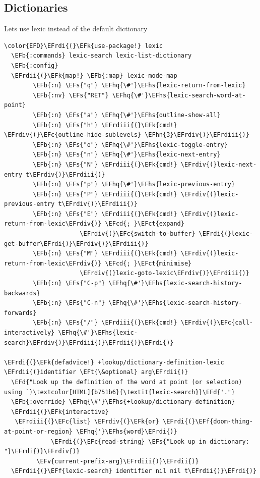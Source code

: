 \documentclass{scrartcl}
\newcommand{\EFk}[1]{\textcolor{EFk}{#1}} %
\newcommand{\EFd}[1]{\textcolor{EFd}{\textit{#1}}} %
\newcommand{\EFt}[1]{\textcolor{EFt}{#1}} %
\newcommand{\EFs}[1]{\textcolor{EFs}{#1}} %
\newcommand{\EFb}[1]{\textcolor{EFb}{#1}} %
\newcommand{\EFct}[1]{\textcolor{EFct}{#1}} %
\newcommand{\EFc}[1]{\textcolor{EFc}{#1}} %
\newcommand{\EFv}[1]{\textcolor{EFv}{#1}} %
\newcommand{\EFf}[1]{\textcolor{EFf}{#1}} %
\newcommand{\EFcd}[1]{\textcolor{EFcd}{#1}} %
\newcommand{\EFhn}[1]{\textcolor{EFhn}{\textbf{#1}}} %
\newcommand{\EFhq}[1]{\textcolor{EFhq}{#1}} %
\newcommand{\EFhs}[1]{\textcolor{EFhs}{#1}} %
\newcommand{\EFrdi}[1]{\textcolor{EFrdi}{#1}} %
\newcommand{\EFrdii}[1]{\textcolor{EFrdii}{#1}} %
\newcommand{\EFrdiii}[1]{\textcolor{EFrdiii}{#1}} %
\newcommand{\EFrdiv}[1]{\textcolor{EFrdiv}{#1}} %
\begin{document}
\subsection{Dictionaries}
\label{sec:org591c301}
Lets use lexic instead of the default dictionary
\begin{Code}
\begin{Verbatim}[]
\color{EFD}\EFrdi{(}\EFk{use-package!} lexic
  \EFb{:commands} lexic-search lexic-list-dictionary
  \EFb{:config}
  \EFrdii{(}\EFk{map!} \EFb{:map} lexic-mode-map
        \EFb{:n} \EFs{"q"} \EFhq{\#'}\EFhs{lexic-return-from-lexic}
        \EFb{:nv} \EFs{"RET"} \EFhq{\#'}\EFhs{lexic-search-word-at-point}
        \EFb{:n} \EFs{"a"} \EFhq{\#'}\EFhs{outline-show-all}
        \EFb{:n} \EFs{"h"} \EFrdiii{(}\EFk{cmd!} \EFrdiv{(}\EFc{outline-hide-sublevels} \EFhn{3}\EFrdiv{)}\EFrdiii{)}
        \EFb{:n} \EFs{"o"} \EFhq{\#'}\EFhs{lexic-toggle-entry}
        \EFb{:n} \EFs{"n"} \EFhq{\#'}\EFhs{lexic-next-entry}
        \EFb{:n} \EFs{"N"} \EFrdiii{(}\EFk{cmd!} \EFrdiv{(}lexic-next-entry t\EFrdiv{)}\EFrdiii{)}
        \EFb{:n} \EFs{"p"} \EFhq{\#'}\EFhs{lexic-previous-entry}
        \EFb{:n} \EFs{"P"} \EFrdiii{(}\EFk{cmd!} \EFrdiv{(}lexic-previous-entry t\EFrdiv{)}\EFrdiii{)}
        \EFb{:n} \EFs{"E"} \EFrdiii{(}\EFk{cmd!} \EFrdiv{(}lexic-return-from-lexic\EFrdiv{)} \EFcd{; }\EFct{expand}
                     \EFrdiv{(}\EFc{switch-to-buffer} \EFrdi{(}lexic-get-buffer\EFrdi{)}\EFrdiv{)}\EFrdiii{)}
        \EFb{:n} \EFs{"M"} \EFrdiii{(}\EFk{cmd!} \EFrdiv{(}lexic-return-from-lexic\EFrdiv{)} \EFcd{; }\EFct{minimise}
                     \EFrdiv{(}lexic-goto-lexic\EFrdiv{)}\EFrdiii{)}
        \EFb{:n} \EFs{"C-p"} \EFhq{\#'}\EFhs{lexic-search-history-backwards}
        \EFb{:n} \EFs{"C-n"} \EFhq{\#'}\EFhs{lexic-search-history-forwards}
        \EFb{:n} \EFs{"/"} \EFrdiii{(}\EFk{cmd!} \EFrdiv{(}\EFc{call-interactively} \EFhq{\#'}\EFhs{lexic-search}\EFrdiv{)}\EFrdiii{)}\EFrdii{)}\EFrdi{)}

\EFrdi{(}\EFk{defadvice!} +lookup/dictionary-definition-lexic \EFrdii{(}identifier \EFt{\&optional} arg\EFrdii{)}
  \EFd{"Look up the definition of the word at point (or selection) using `}\textcolor[HTML]{b751b6}{\textit{lexic-search}}\EFd{'."}
  \EFb{:override} \EFhq{\#'}\EFhs{+lookup/dictionary-definition}
  \EFrdii{(}\EFk{interactive}
   \EFrdiii{(}\EFc{list} \EFrdiv{(}\EFk{or} \EFrdi{(}\EFf{doom-thing-at-point-or-region} \EFhq{'}\EFhs{word}\EFrdi{)}
             \EFrdi{(}\EFc{read-string} \EFs{"Look up in dictionary: "}\EFrdi{)}\EFrdiv{)}
         \EFv{current-prefix-arg}\EFrdiii{)}\EFrdii{)}
  \EFrdii{(}\EFf{lexic-search} identifier nil nil t\EFrdii{)}\EFrdi{)}
\end{Verbatim}
\end{Code}
\end{document}
